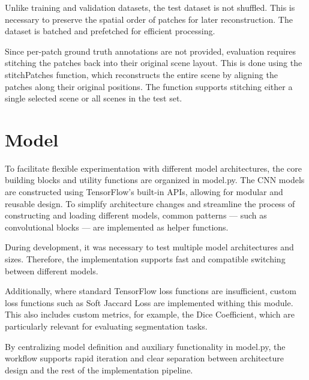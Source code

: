 {Unlike training and validation datasets, the test dataset is not shuffled. This is necessary to preserve the spatial order of patches for later reconstruction. The dataset is batched and prefetched for efficient processing.

Since per-patch ground truth annotations are not provided, evaluation requires stitching the patches back into their original scene layout. This is done using the stitchPatches function, which reconstructs the entire scene by aligning the patches along their original positions. The function supports stitching either a single selected scene or all scenes in the test set.


\section{Model}

To facilitate flexible experimentation with different model architectures, the core building blocks and utility functions are organized in model.py. The CNN models are constructed using TensorFlow’s built-in APIs, allowing for modular and reusable design. To simplify architecture changes and streamline the process of constructing and loading different models, common patterns --- such as convolutional blocks --- are implemented as helper functions.

During development, it was necessary to test multiple model architectures and sizes. Therefore, the implementation supports fast and compatible switching between different models.

Additionally, where standard TensorFlow loss functions are insufficient, custom loss functions such as Soft Jaccard Loss are implemented withing this module. This also includes custom metrics, for example, the Dice Coefficient, which are particularly relevant for evaluating segmentation tasks.

By centralizing model definition and auxiliary functionality in model.py, the workflow supports rapid iteration and clear separation between architecture design and the rest of the implementation pipeline.


}
